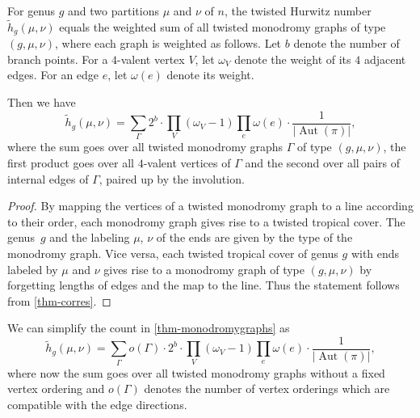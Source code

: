 \documentclass[ALCO,published]{cedram}
\DeclareMathOperator{\Aut}{Aut}
\begin{document}
\begin{coro}\label{thm-monodromygraphs}
For genus $g$ and two partitions $\mu$ and $\nu$ of $n$, the twisted Hurwitz number $\tilde{h}_g(\mu,\nu)$ equals the weighted sum of all twisted monodromy graphs of type $(g,\mu,\nu)$, where each graph is weighted as follows. Let $b$ denote the number of branch points.
For a $4$-valent vertex $V$, let $\omega_V$ denote the weight of its $4$ adjacent edges. For an edge $e$, let $\omega(e)$ denote its weight. 

Then we have
$$\tilde{h}_g(\mu,\nu)=\sum_{\Gamma} 2^{b}\cdot \prod_V (\omega_V-1)\prod_e\omega(e)\cdot \frac{1}{|\Aut(\pi)|},$$
where the sum goes over all twisted monodromy graphs $\Gamma$ of type $(g,\mu,\nu)$, the first product goes over all $4$-valent vertices of $\Gamma$ and the second over all pairs of internal edges of $\Gamma$, paired up by the involution.
\end{coro}

\begin{proof}
By mapping the vertices of a twisted monodromy graph to a line according to their order, each monodromy graph gives rise to a twisted tropical cover. The genus~$g$ and the labeling $\mu$, $\nu$ of the ends are given by the type of the monodromy graph. Vice versa, each twisted tropical cover of genus $g$ with ends labeled by $\mu$ and $\nu$ gives rise to a monodromy graph of type $(g,\mu,\nu)$ by forgetting lengths of edges and the map to the line. Thus the statement follows from \cref{thm-corres}. 
\end{proof}

\begin{coro}\label{cor-monodromygraphs}
We can simplify the count in \cref{thm-monodromygraphs} as
$$\tilde{h}_g(\mu,\nu)=\sum_{\Gamma} o(\Gamma) \cdot 2^{b}\cdot \prod_V (\omega_V-1)\prod_e\omega(e)\cdot \frac{1}{|\Aut(\pi)|},$$
where now the sum goes over all twisted monodromy graphs without a fixed vertex ordering and $o(\Gamma)$ denotes the number of vertex orderings which are compatible with the edge directions.
\end{coro}
\end{document}
